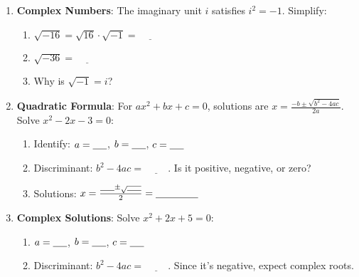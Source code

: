 \documentclass[12pt]{article}
\begin{document}
\begin{enumerate}[label=6.\arabic*]
    \item \textbf{Complex Numbers}: The imaginary unit \( i \) satisfies \( i^2 = -1 \). Simplify:
    \begin{enumerate}[label=\alph*)]
        \item \( \sqrt{-16} = \sqrt{16} \cdot \sqrt{-1} = \underline{\hspace{1cm}} \)
        \item \( \sqrt{-36} = \underline{\hspace{1cm}} \)
        \item Why is \( \sqrt{-1} = i \)? \underline{\hspace{6cm}}
    \end{enumerate}
    \item \textbf{Quadratic Formula}: For \( ax^2 + bx + c = 0 \), solutions are \( x = \frac{-b \pm \sqrt{b^2 - 4ac}}{2a} \). Solve \( x^2 - 2x - 3 = 0 \):
    \begin{enumerate}[label=\alph*)]
        \item Identify: \( a = \underline{\hspace{0.5cm}} \), \( b = \underline{\hspace{0.5cm}} \), \( c = \underline{\hspace{0.5cm}} \)
        \item Discriminant: \( b^2 - 4ac = \underline{\hspace{1cm}} \). Is it positive, negative, or zero? \underline{\hspace{1cm}}
        \item Solutions: \( x = \frac{\underline{\hspace{0.5cm}} \pm \sqrt{\underline{\hspace{0.5cm}}}}{2} = \underline{\hspace{1.5cm}} \)
    \end{enumerate}
    \item \textbf{Complex Solutions}: Solve \( x^2 + 2x + 5 = 0 \):
    \begin{enumerate}[label=\alph*)]
        \item \( a = \underline{\hspace{0.5cm}} \), \( b = \underline{\hspace{0.5cm}} \), \( c = \underline{\hspace{0.5cm}} \)
        \item Discriminant: \( b^2 - 4ac = \underline{\hspace{1cm}} \). Since it’s negative, expect complex roots.

\end{enumerate}
\end{enumerate}
\end{document}
